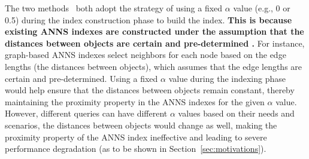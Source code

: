 {%
The two methods~\cite{milvus2021} 
both adopt the strategy of using a fixed}
$\alpha$ value (e.g., 0 or 0.5) during the index construction phase to build the index. \textbf{This is because existing %
ANNS indexes are constructed under the assumption that the distances between objects are certain and pre-determined%
.} %
{For instance, graph-based ANNS indexes select neighbors for each node based on the edge lengths (the distances between objects), which assumes that the edge lengths are certain and pre-determined.}
{%
Using a fixed $\alpha$ value} during the indexing phase {%
would help} ensure that %
{the distances between objects} %
remain constant, %
{thereby maintaining the proximity property in the ANNS indexes for the given $\alpha$ value.} %
However, 
{%
different queries can %
have different $\alpha$ values %
}
based on their needs and scenarios, the 
distances between objects %
would change %
as well, making the proximity property %
of the %
ANNS index ineffective and leading to severe performance degradation (as to be shown in Section~\ref{sec:motivations}).


